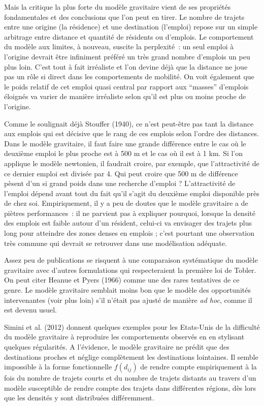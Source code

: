 \documentclass[
  10pt,
  a4paper,
  numbers=noendperiod,
  DIV=9]{scrartcl}
\begin{document}
Mais la critique la plus forte du modèle gravitaire vient de ses
propriétés fondamentales et des conclusions que l'on peut en tirer. Le
nombre de trajets entre une origine (la résidence) et une destination
(l'emploi) repose sur un simple arbitrage entre distance et quantité de
résidents ou d'emplois. Le comportement du modèle aux limites, à
nouveau, suscite la perplexité~: un seul emploi à l'origine devrait être
infiniment préféré un très grand nombre d'emplois un peu plus loin.
C'est tout à fait irréaliste et l'on devine déjà que la distance ne joue
pas un rôle si direct dans les comportements de mobilité. On voit
également que le poids relatif de cet emploi quasi central par rapport
aux ``masses'' d'emplois éloignés va varier de manière irréaliste selon
qu'il est plus ou moins proche de l'origine.

Comme le soulignait déjà Stouffer (1940), ce n'est peut-être pas tant la
distance aux emplois qui est décisive que le rang de ces emplois selon
l'ordre des distances. Dans le modèle gravitaire, il faut faire une
grande différence entre le cas où le deuxième emploi le plus proche est
à 500 m et le cas où il est à 1 km. Si l'on applique le modèle
newtonien, il faudrait croire, par exemple, que l'attractivité de ce
dernier emploi est divisée par 4. Qui peut croire que 500 m de
différence pèsent d'un si grand poids dans une recherche d'emploi ?
L'attractivité de l'emploi dépend avant tout du fait qu'il s'agit du
deuxième emploi disponible près de chez soi. Empiriquement, il y a peu
de doutes que le modèle gravitaire a de piètres performances~: il ne
parvient pas à expliquer pourquoi, lorsque la densité des emplois est
faible autour d'un résident, celui-ci va envisager des trajets plus long
pour atteindre des zones denses en emplois ; c'est pourtant une
observation très commune qui devrait se retrouver dans une modélisation
adéquate.

Assez peu de publications se risquent à une comparaison systématique du
modèle gravitaire avec d'autres formulations qui respecteraient la
première loi de Tobler. On peut citer Heanue et Pyers (1966) comme une
des rares tentatives de ce genre. Le modèle gravitaire semblait moins
bon que le modèle des opportunités intervenantes (voir plus loin) s'il
n'était pas ajusté de manière \emph{ad hoc}, comme il est devenu usuel.

Simini et al. (2012) donnent quelques exemples pour les Etats-Unis de la
difficulté du modèle gravitaire à reproduire les comportements observés
en en stylisant quelques régularités. A l'évidence, le modèle gravitaire
ne prédit que des destinations proches et néglige complètement les
destinations lointaines. Il semble impossible à la forme fonctionnelle
\(f(d_{ij})\) de rendre compte empiriquement à la fois du nombre de
trajets courts et du nombre de trajets distants au travers d'un modèle
susceptible de rendre compte des trajets dans différentes régions, dès
lors que les densités y sont distribuées différemment.
\end{document}
